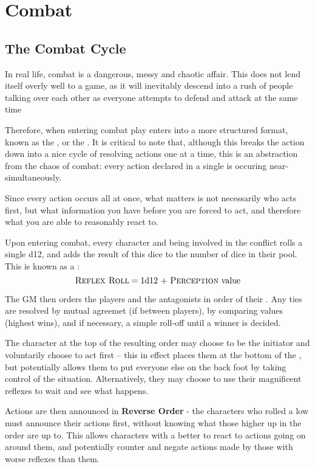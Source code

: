 
\chapter{Combat}

\section{The Combat Cycle}

In real life, combat is a dangerous, messy and chaotic affair. This does not lend itself overly well to a game, as it will inevitably descend into a rush of people talking over each other as everyone attempts to defend and attack at the same time 

Therefore, when entering combat play enters into a more structured format, known as the , or the . It is critical to note that, although this breaks the action down into a nice cycle of resolving actions one at a time, this is an abstraction from the chaos of combat: every action declared in a single  is occuring near-simultaneously.

Since every action occurs all at once, what matters is not necessarily who acts first, but what information you have before you are forced to act, and therefore what you are able to reasonably react to.

Upon entering combat, every character and being involved in the conflict rolls a single d12, and adds the result of this dice to the number of dice in their  pool. This is known as a :
$$ \text{\textsc{Reflex Roll}} = \text{1d12 + \textsc{Perception} value} $$

The GM then orders the players and the antagonists in order of their . Any ties are resolved by mutual agreemet (if between players), by comparing  values (highest wins), and if necessary, a simple roll-off until a winner is decided.

The character at the top of the resulting  order may choose to be the initiator and voluntarily choose to act first -- this in effect places them at the bottom of the , but potentially allows them to put everyone else on the back foot by taking control of the situation. Alternatively, they may choose to use their magnificent reflexes to wait and see what happens.

Actions are then announced in {\bf Reverse Order} - the characters who rolled a low  must announce their actions first, without knowing what those higher up in the order are up to. This allows characters with a better  to react to actions going on around them, and potentially counter and negate actions made by those with worse reflexes than them.  

